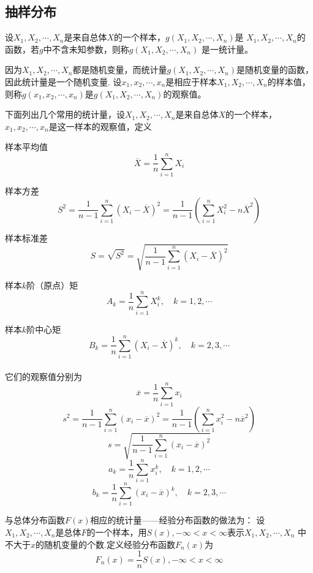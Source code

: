 \subsection{抽样分布}
\begin{definition}
    \begin{definition}
        设$X_1,X_2,\cdots,X_n$是来自总体$X$的一个样本，$g(X_1,X_2,\cdots,X_n)$是
        $X_1,X_2,\cdots,X_n$的函数，若$g$中不含未知参数，则称$g(X_1,X_2,\cdots,X_n)$
        是一{\heiti 统计量}。

        因为$X_1,X_2,\cdots,X_n$都是随机变量，而统计量$g(X_1,X_2,\cdots,X_n)$是随机变量的函数，因此统计量是一个随机变量.
        设$x_1,x_2,\cdots,x_n$是相应于样本$X_1,X_2,\cdots,X_n$的样本值，则称$g(x_1,x_2,\cdots,x_n)$是$g(X_1,X_2,\cdots,X_n)$的观察值。

        下面列出几个常用的统计量，设$X_1,X_2,\cdots,X_n$是来自总体$X$的一个样本，$x_1,x_2,\cdots,x_n$是这一样本的观察值，定义

        {\heiti 样本平均值} $$\overline{X}=\frac{1}{n}\sum_{i=1}^nX_i$$

        {\heiti 样本方差}$$S^2=\frac{1}{n-1}\sum_{i=1}^n{(X_i-\overline{X})}^2=\frac{1}{n-1}(\sum_{i=1}^nX_i^2-n\overline{X}^2)$$

        {\heiti 样本标准差}$$S=\sqrt{S^2}=\sqrt{\frac{1}{n-1}\sum_{i=1}^n{(X_i-\overline{X})}^2}$$

        {\heiti 样本$k$阶（原点）矩}$$A_k=\frac{1}{n}\sum_{i=1}^nX_i^k,\quad k=1,2,\cdots$$

        {\heiti 样本$k$阶中心矩}$$B_k=\frac{1}{n}\sum_{i=1}^n{(X_i-\overline{X})}^k,\quad k=2,3,\cdots$$\\
        它们的观察值分别为
        $$\overline{x}=\frac{1}{n}\sum_{i=1}^nx_i$$
        $$s^2=\frac{1}{n-1}\sum_{i=1}^n{(x_i-\overline{x})}^2=\frac{1}{n-1}(\sum_{i=1}^nx_i^2-n\overline{x}^2)$$
        $$s=\sqrt{\frac{1}{n-1}\sum_{i=1}^n{(x_i-\overline{x})}^2}$$
        $$a_k=\frac{1}{n}\sum_{i=1}^nx_i^k,\quad k=1,2,\cdots$$
        $$b_k=\frac{1}{n}\sum_{i=1}^n{(x_i-\overline{x})}^k,\quad k=2,3,\cdots$$
    \end{definition}
\end{definition}

\begin{definition}[经验分布函数]
    与总体分布函数$F(x)$相应的统计量——经验分布函数的做法为：
    设$X_1,X_2,\cdots,X_n$是总体$F$的一个样本，用$S(x),-\infty<x<\infty$表示$X_1,X_2,\cdots,X_n$
    中不大于$x$的随机变量的个数.定义经验分布函数$F_n(x)$为
    $$F_n(x)=\frac{1}{n}S(x),-\infty<x<\infty$$
\end{definition}

